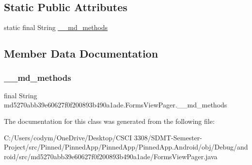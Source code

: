 \subsection*{Static Public Attributes}
\begin{DoxyCompactItemize}
\item 
static final String \hyperlink{classmd5270abb39e60627f0f200893b490a1ade_1_1_forms_view_pager_a0afe4852089db54f50fdcd4673a3538f}{\+\_\+\+\_\+md\+\_\+methods}
\end{DoxyCompactItemize}


\subsection{Member Data Documentation}
\mbox{\label{classmd5270abb39e60627f0f200893b490a1ade_1_1_forms_view_pager_a0afe4852089db54f50fdcd4673a3538f}} 
\subsubsection{\texorpdfstring{\+\_\+\+\_\+md\+\_\+methods}{\_\_md\_methods}}
{\footnotesize\ttfamily final String md5270abb39e60627f0f200893b490a1ade.\+Forms\+View\+Pager.\+\_\+\+\_\+md\+\_\+methods\hspace{0.3cm}{\ttfamily [static]}}



The documentation for this class was generated from the following file\+:\begin{DoxyCompactItemize}
\item 
C\+:/\+Users/codym/\+One\+Drive/\+Desktop/\+C\+S\+C\+I 3308/\+S\+D\+M\+T-\/\+Semester-\/\+Project/src/\+Pinned/\+Pinned\+App/\+Pinned\+App/\+Pinned\+App.\+Android/obj/\+Debug/android/src/md5270abb39e60627f0f200893b490a1ade/Forms\+View\+Pager.\+java\end{DoxyCompactItemize}
